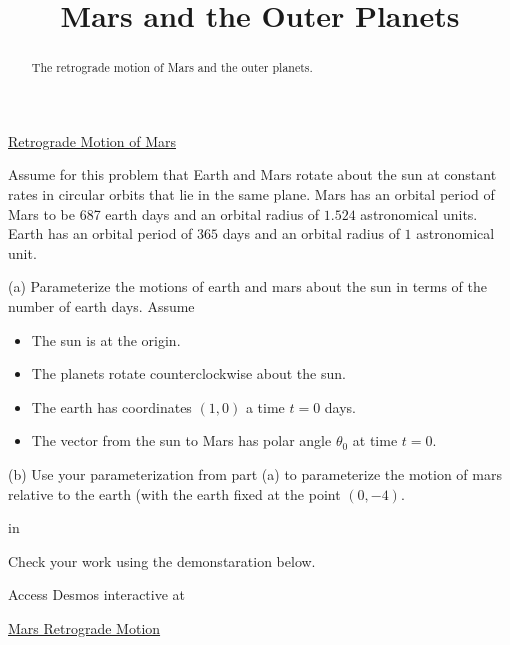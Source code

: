 \documentclass{ximera}
\title{Mars and the Outer Planets}
\newcommand{\pskip}{\vskip 0.1 in}
\begin{document}
\begin{abstract}
The retrograde motion of Mars and the outer planets.
\end{abstract}
\maketitle

\begin{exploration} \label{Exphjhhkjglvg}

\begin{center}
\end{center}

\href{https://www.youtube.com/watch?v=1nVSzzYCAYk}{Retrograde Motion of Mars}

\end{exploration}

\begin{exploration}  \label{Eddfsdfd6yhh}
Assume for this problem that Earth and Mars rotate about the sun at constant rates in circular orbits that lie in the same plane. Mars has an orbital period of Mars to be 687 earth days and an orbital radius of $1.524$ astronomical units. Earth has an orbital period of $365$ days and an orbital radius of $1$ astronomical unit.

(a) Parameterize the motions of earth and mars about the sun in terms of the number of earth days. Assume

\begin{itemize}

\item{The sun is at the origin.}

\item{The planets rotate counterclockwise about the sun.}

\item{The earth has coordinates $(1,0)$ a time $t=0$ days.}

\item{The vector from the sun to Mars has polar angle $\theta_0$ at time $t=0$.}

\end{itemize}

(b) Use your parameterization from part (a)  to parameterize the motion of mars relative to the earth (with the earth  fixed at the point $(0,-4)$.

\pskip

Check your work using the demonstaration below.

Access Desmos interactive at
 
\href{https://www.desmos.com/calculator/htc4xgrjxs}{Mars Retrograde Motion}

 
\begin{onlineOnly}
    \begin{center}
\end{center}
\end{onlineOnly}


\end{exploration}
\end{document}
